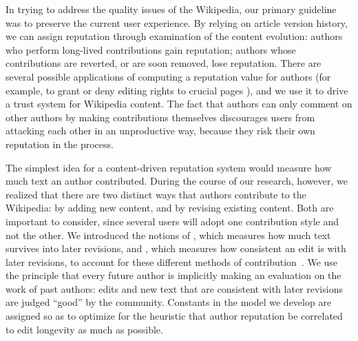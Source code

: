 
In trying to address the quality issues of the Wikipedia,
our primary guideline was to preserve the current user experience.
By relying on article version history, we can assign reputation
through examination of the content evolution:
authors who perform long-lived contributions gain reputation; authors
whose contributions are reverted, or are soon removed, lose reputation.
There are several possible applications of computing a reputation
value for authors (for example, to grant or deny editing rights to
crucial pages \cite{Blaze96}), and we use it to drive a trust system for
Wikipedia content.
The fact that authors can only comment on other authors by
making contributions themselves discourages users from attacking
each other in an unproductive way, because they risk their own reputation in the process.


The simplest idea for a content-driven reputation system would measure
how much text an author contributed.
During the course of our research, however, we realized that there are
two distinct ways that authors contribute to the Wikipedia: by adding
new content, and by revising existing content.
Both are important to consider, since several users will
adopt one contribution style and not the other.
We introduced the notions of
, which measures how much text survives
into later revisions, and , which measures
how consistent an edit is with later revisions,
to account for these different methods of contribution~\cite{www07}.
We use the principle that every future author is
implicitly making an evaluation on the work of past authors:
edits and new text that are consistent with later revisions
are judged ``good'' by the community.
Constants in the model we develop are assigned so as to optimize
for the heuristic that author reputation
be correlated to edit longevity as much as possible.

